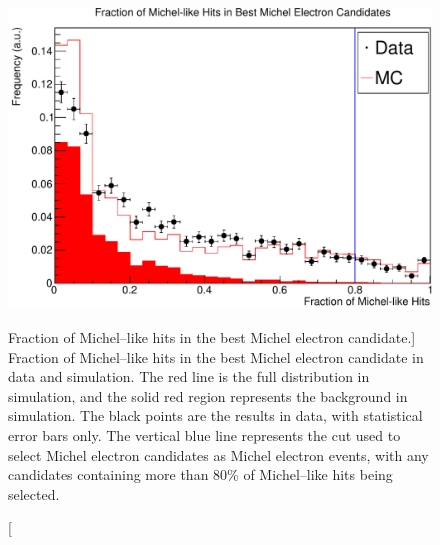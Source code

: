 \begin{figure}
	\centering
	\includegraphics[width=\textwidth]{figures/frac_michel.pdf}
	\caption
	[Fraction of Michel--like hits in the best Michel electron candidate.]
	{Fraction of Michel--like hits in the best Michel electron candidate in data
	and simulation. The red line is the full distribution in simulation, and the
	solid red region represents the background in simulation. The black
	points are the results in data, with statistical error bars only. The vertical
	blue line represents the cut used to select Michel electron candidates as
	Michel electron events, with any candidates containing more than 80\% of
	Michel--like  hits being selected.}
	\label{fig:michel_like_frac}
\end{figure}

